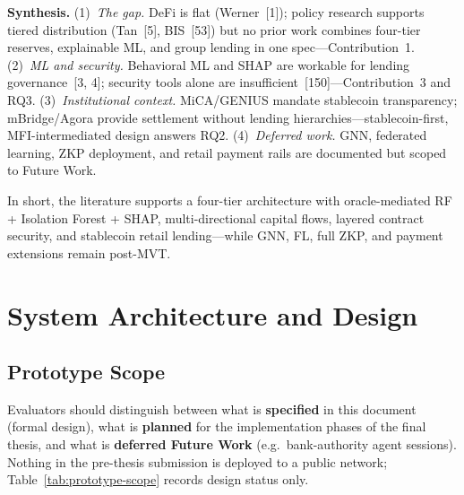 \documentclass[12pt,a4paper]{report}
\begin{document}
\textbf{Synthesis.} (1)~\textit{The gap.} DeFi is flat (Werner~[1]); policy research supports tiered distribution (Tan~[5], BIS~[53]) but no prior work combines four-tier reserves, explainable ML, and group lending in one spec---Contribution~1. (2)~\textit{ML and security.} Behavioral ML and SHAP are workable for lending governance~[3, 4]; security tools alone are insufficient~[150]---Contribution~3 and RQ3. (3)~\textit{Institutional context.} MiCA/GENIUS mandate stablecoin transparency; mBridge/Agora provide settlement without lending hierarchies---stablecoin-first, MFI-intermediated design answers RQ2. (4)~\textit{Deferred work.} GNN, federated learning, ZKP deployment, and retail payment rails are documented but scoped to Future Work.

In short, the literature supports a four-tier architecture with oracle-mediated RF + Isolation Forest + SHAP, multi-directional capital flows, layered contract security, and stablecoin retail lending---while GNN, FL, full ZKP, and payment extensions remain post-MVT.

\chapter{System Architecture and Design}

\section{Prototype Scope}
\label{sec:prototype-scope}

Evaluators should distinguish between what is \textbf{specified} in this document (formal design), what is \textbf{planned} for the implementation phases of the final thesis, and what is \textbf{deferred Future Work} (e.g.\ bank-authority agent sessions). Nothing in the pre-thesis submission is deployed to a public network; Table~\ref{tab:prototype-scope} records design status only.
\end{document}

